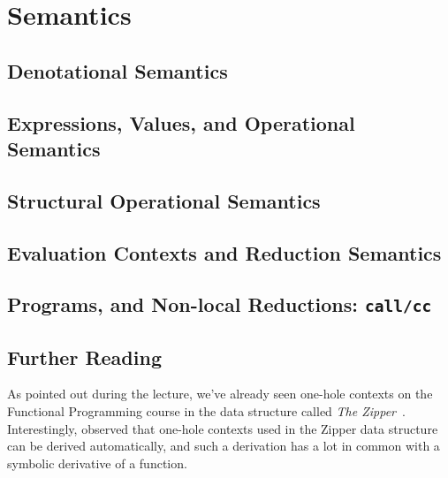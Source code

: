 \chapter{Semantics}

\section{Denotational Semantics}

\section{Expressions, Values, and Operational Semantics}

\section{Structural Operational Semantics}

\section{Evaluation Contexts and Reduction Semantics}

\section{Programs, and Non-local Reductions: \texttt{call/cc}}

\section{Further Reading}

As pointed out during the lecture, we've already seen one-hole contexts
on the Functional Programming course
in the data structure called \emph{The Zipper}~\citep{Huet97}.
Interestingly, \citet{McBride} observed that one-hole contexts used
in the Zipper data structure can be derived automatically,
and such a derivation has a lot in common with
a symbolic derivative of a function.

